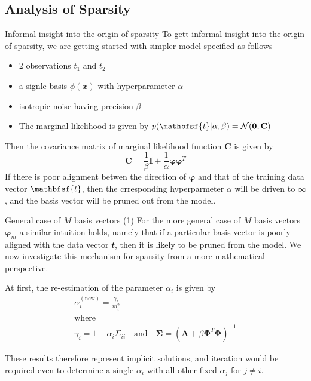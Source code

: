 \documentclass{bredelebeamer}
\begin{document}
\subsection{Analysis of Sparsity}
\begin{frame}{Informal insight into the origin of sparsity}
  To gett informal insight into the origin of sparsity, we are getting started
  with simpler model specified as follows
  \begin{itemize}
    \item 2 observations $t_1$ and $t_2$
    \item a signle basis $\phi(\mathbfit{x})$ with hyperparameter $\alpha$
    \item isotropic noise having precision $\beta$
    \item The marginal likelihood is given by
    $p(\mathbfsf{t} | \alpha, \beta) = \mathcal{N}(\mathbf{0}, \mathbf{C})$
  \end{itemize}
  \vspace{1.0\baselineskip}

  Then the covariance matrix of marginal likelihood function $\mathbf{C}$ is given by
  \begin{equation}
    \mathbf{C} = \frac{1}{\beta}\mathbf{I} + \frac{1}{\alpha}\boldsymbol{\varphi}\boldsymbol{\varphi}^T
  \end{equation}
  If there is poor alignment betwen the direction of $\boldsymbol{\varphi}$ and
  that of the training data vector $\mathbfsf{t}$, then the crresponding hyperparmeter
  $\alpha$ will be driven to $\infty$, and the basis vector will be pruned out from the model.
\end{frame}

\begin{frame}{General case of $M$ basis vectors (1)}
  For the more general case of $M$ basis vectors $\boldsymbol{\varphi}_m$ a similar
  intuition holds, namely that if a particular basis vector is poorly aligned with
  the data vector $\mathbfit{t}$, then it is likely to be pruned from the model.
  We now investigate this mechanism for sparsity from a more mathematical perspective.
  \vspace{1.0\baselineskip}

  At first, the re-estimation of the parameter $\alpha_i$ is given by
  \begin{equation}
    \begin{gathered}
      \alpha_i^{(\textrm{new})} = \frac{\gamma_i}{m_i^2} \\
      \textrm{where} \\
      \gamma_i = 1 - \alpha_i \Sigma_{ii}
      \quad \textrm{and} \quad
      \boldsymbol{\Sigma} = {(\mathbf{A} + \beta \boldsymbol{\Phi}^T \boldsymbol{\Phi})}^{-1}
    \end{gathered}
  \end{equation}
  \vspace{1.0\baselineskip}

  These results therefore represent implicit solutions, and iteration would be
  required even to determine a single $\alpha_i$ with all other fixed $\alpha_j$ for $j \neq i$.
\end{frame}
\end{document}
